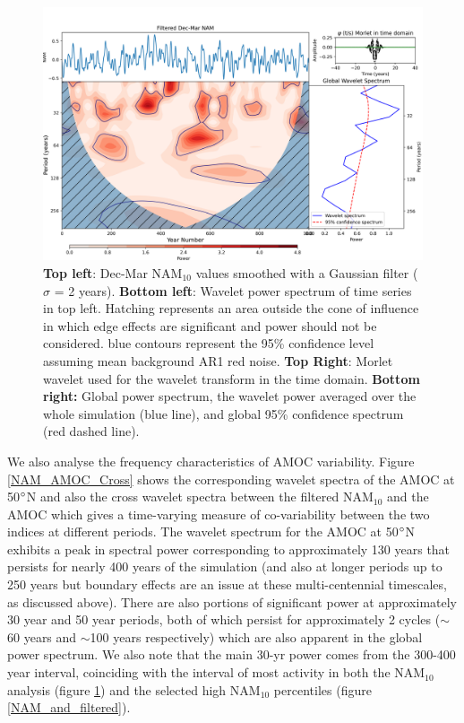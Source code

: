 \begin{figure}[h!]
\begin{center}
\noindent\includegraphics[width = 0.8\linewidth]{Figures/Figures-surface/NAM_wavelet_UKESM.png}
\caption[Wavelet power spectrum of smoothed NAM$_{10}$ index]{\textbf{Top left}: Dec-Mar NAM$_{10}$ values smoothed with a Gaussian filter ($\sigma$ = 2 years). \textbf{Bottom left}: Wavelet power spectrum of time series in top left. Hatching represents an area outside the cone of influence in which edge effects are significant and power should not be considered. blue contours represent the 95\% confidence level assuming mean background AR1 red noise. \textbf{Top Right}: Morlet wavelet used for the wavelet transform in the time domain. \textbf{Bottom right:} Global power spectrum, the wavelet power averaged over the whole simulation (blue line), and global 95\% confidence spectrum (red dashed line).}
\label{NAM_wavelet}
\end{center}
\end{figure}

We also analyse the frequency characteristics of AMOC variability. Figure \ref{NAM_AMOC_Cross} shows the corresponding wavelet spectra of the AMOC at 50$\degree$N and also the cross wavelet spectra between the filtered NAM$_{10}$ and the AMOC which gives a time-varying measure of co-variability between the two indices at different periods. The wavelet spectrum for the AMOC at 50$\degree$N exhibits a peak in spectral power corresponding to approximately 130 years that persists for nearly 400 years of the simulation (and also at longer periods up to 250 years but boundary effects are an issue at these multi-centennial timescales, as discussed above). There are also portions of significant power at approximately 30 year and 50 year periods, both of which persist for approximately 2 cycles ($\sim$60 years and $\sim$100 years respectively) which are also apparent in the global power spectrum. We also note that the main 30-yr power comes from the 300-400 year interval, coinciding with the interval of most activity in both the NAM$_{10}$ analysis (figure \ref{NAM_wavelet}) and the selected high NAM$_{10}$ percentiles (figure \ref{NAM_and_filtered}). 
 
